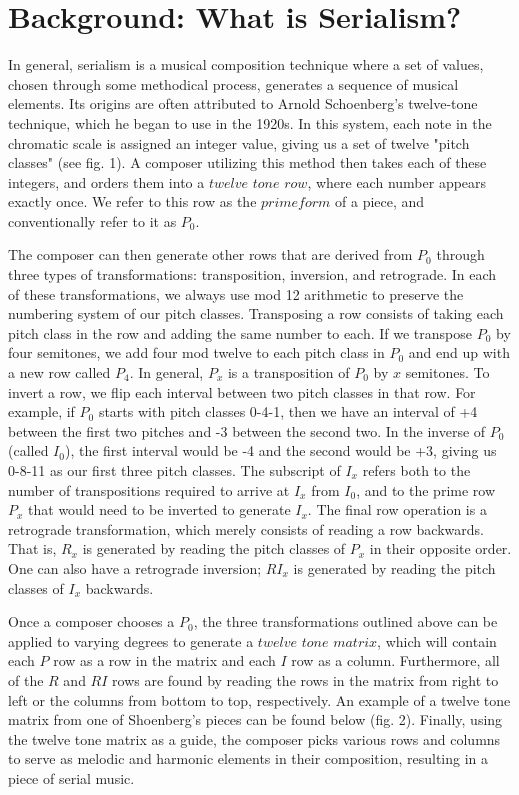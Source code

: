 \section{Background: What is Serialism?}

In general, serialism is a musical composition technique where a set of values, chosen through some methodical process, 
generates a sequence of musical elements. Its origins are often attributed to Arnold Schoenberg's twelve-tone technique, which
he began to use in the 1920s. In this system, each note in the chromatic scale is assigned an integer value, giving us a set of twelve
"pitch classes" (see fig. 1).
A composer utilizing this method then takes each of these integers, and orders them into a $twelve$ $tone$ $row$, where 
each number appears exactly once. We refer to this row as the $prime form$ of a piece, and conventionally refer 
to it as $P_0$. 

The composer can then generate other rows that are derived from $P_0$ through three types of transformations:
transposition, inversion, and retrograde. In each of these transformations, we always use mod 12 arithmetic to preserve the 
numbering system of our pitch classes. Transposing a row consists of taking each pitch class in the row and adding the same number 
to each. If we transpose $P_0$ by four semitones, we add four mod twelve to each pitch class in $P_0$ and end up with a new row 
called $P_4$. In general, $P_x$ is a transposition of $P_0$ by $x$ semitones. To invert a row, we flip each interval between two 
pitch classes in that row. For example, if $P_0$ starts with pitch classes 0-4-1, then we have an interval of +4 between the first two 
pitches and -3 between the second two. In the inverse of $P_0$ (called $I_0$), the first interval would be -4 and the second would 
be +3, giving us 0-8-11 as our first three pitch classes. The subscript of $I_x$  refers both to the number of transpositions required 
to arrive at $I_x$ from $I_0$, and to the prime row $P_x$ that would need to be inverted to generate $I_x$. The final row 
operation is a retrograde transformation, which merely consists of reading a row backwards. That is, $R_x$ is generated by reading 
the pitch classes of $P_x$ in their opposite order. One can also have a retrograde inversion; $RI_x$ is generated by reading the 
pitch classes of $I_x$ backwards.

Once a composer chooses a $P_0$, the three transformations outlined above can be applied to varying degrees to generate a $twelve$ $tone$ $matrix$, which will contain each $P$ row as a row in the matrix and each $I$ row as a column.
Furthermore, all of the $R$ and $RI$ rows are found by reading the rows in the matrix from right to left or the columns 
from bottom to top, respectively. An example of a 
twelve tone matrix from one of Shoenberg's pieces can be found below (fig. 2). Finally, using the twelve tone matrix as a guide,
the composer picks various rows and columns to serve as melodic and harmonic elements in their composition, resulting in a piece
of serial music.





